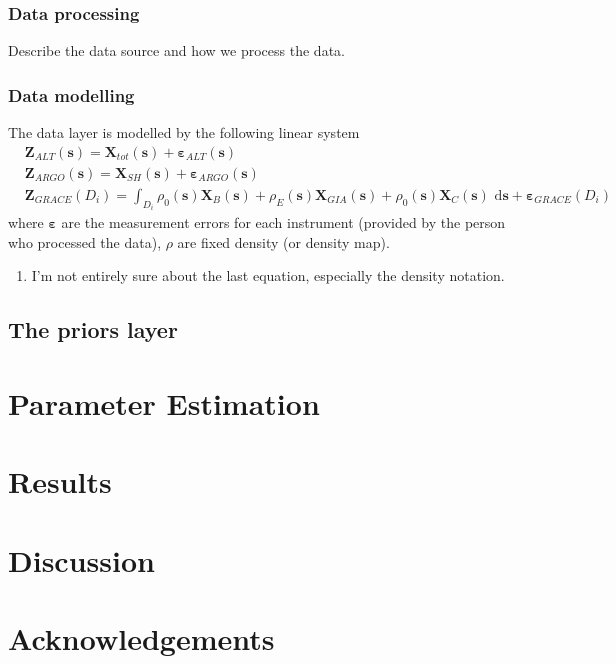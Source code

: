 \documentclass[cmbright,fleqn,referee]{envauth}
\newcommand{\bX}{\bm{X}}
\newcommand{\bs}{\bm{s}}
\newcommand{\bZ}{\bm{Z}}
\newcommand{\ubd}{\,\bm{\mathrm{d}}}
\begin{document}
\subsubsection{Data processing}
Describe the data source and how we process the data.

\subsubsection{Data modelling}
The data layer is modelled by the following linear system
\begin{align}
&\bZ_{ALT}(\bs) = \bX_{tot}(\bs) + \bm{\varepsilon}_{ALT}(\bs) \\
&\bZ_{ARGO}(\bs) = \bX_{SH}(\bs) + \bm{\varepsilon}_{ARGO}(\bs)\\
&\bZ_{GRACE}(D_i) = \int_{D_i} \rho_0(\bs) \bX_{B}(\bs) +  \rho_E(\bs) \bX_{GIA}(\bs) + \rho_0(\bs) \bX_{C}(\bs) \, \ubd \bs + \bm{\varepsilon}_{GRACE}(D_i)
\end{align}
where $\bm{\varepsilon}$ are the measurement errors for each instrument (provided by the person who processed the data), $\rho$ are fixed density (or density map).
\begin{enumerate}
\item I'm not entirely sure about the last equation, especially the density notation.
\end{enumerate}
\subsection{The priors layer}


\section{Parameter Estimation}
\label{s:estimate}



\section{Results}
\label{s:result}

\section{Discussion}
\label{s:discuss}

\section*{Acknowledgements}
\end{document}
